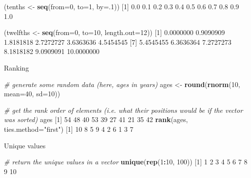 \documentclass[]{article}
\newenvironment{Shaded}{\begin{snugshade}}{\end{snugshade}}
\newcommand{\CommentTok}[1]{\textcolor[rgb]{0.56,0.35,0.01}{\textit{#1}}}
\newcommand{\DataTypeTok}[1]{\textcolor[rgb]{0.13,0.29,0.53}{#1}}
\newcommand{\DecValTok}[1]{\textcolor[rgb]{0.00,0.00,0.81}{#1}}
\newcommand{\FloatTok}[1]{\textcolor[rgb]{0.00,0.00,0.81}{#1}}
\newcommand{\KeywordTok}[1]{\textcolor[rgb]{0.13,0.29,0.53}{\textbf{#1}}}
\newcommand{\NormalTok}[1]{#1}
\newcommand{\OperatorTok}[1]{\textcolor[rgb]{0.81,0.36,0.00}{\textbf{#1}}}
\newcommand{\StringTok}[1]{\textcolor[rgb]{0.31,0.60,0.02}{#1}}
\begin{document}
\begin{Shaded}
\begin{Highlighting}[]
\NormalTok{(tenths  <-}\StringTok{ }\KeywordTok{seq}\NormalTok{(}\DataTypeTok{from=}\DecValTok{0}\NormalTok{, }\DataTypeTok{to=}\DecValTok{1}\NormalTok{, }\DataTypeTok{by=}\NormalTok{.}\DecValTok{1}\NormalTok{))}
\NormalTok{ [}\DecValTok{1}\NormalTok{] }\FloatTok{0.0} \FloatTok{0.1} \FloatTok{0.2} \FloatTok{0.3} \FloatTok{0.4} \FloatTok{0.5} \FloatTok{0.6} \FloatTok{0.7} \FloatTok{0.8} \FloatTok{0.9} \FloatTok{1.0}

\NormalTok{(twelfths <-}\StringTok{ }\KeywordTok{seq}\NormalTok{(}\DataTypeTok{from=}\DecValTok{0}\NormalTok{, }\DataTypeTok{to=}\DecValTok{10}\NormalTok{, }\DataTypeTok{length.out=}\DecValTok{12}\NormalTok{))}
\NormalTok{ [}\DecValTok{1}\NormalTok{]  }\FloatTok{0.0000000}  \FloatTok{0.9090909}  \FloatTok{1.8181818}  \FloatTok{2.7272727}  \FloatTok{3.6363636}  \FloatTok{4.5454545}
\NormalTok{ [}\DecValTok{7}\NormalTok{]  }\FloatTok{5.4545455}  \FloatTok{6.3636364}  \FloatTok{7.2727273}  \FloatTok{8.1818182}  \FloatTok{9.0909091} \FloatTok{10.0000000}
\end{Highlighting}
\end{Shaded}

Ranking

\begin{Shaded}
\begin{Highlighting}[]
\CommentTok{# generate some random data (here, ages in years)}
\NormalTok{ages <-}\StringTok{ }\KeywordTok{round}\NormalTok{(}\KeywordTok{rnorm}\NormalTok{(}\DecValTok{10}\NormalTok{, }\DataTypeTok{mean=}\DecValTok{40}\NormalTok{, }\DataTypeTok{sd=}\DecValTok{10}\NormalTok{))}

\CommentTok{# get the rank order of elements (i.e. what their positions would be if the vector was sorted)}
\NormalTok{ages}
\NormalTok{ [}\DecValTok{1}\NormalTok{] }\DecValTok{54} \DecValTok{48} \DecValTok{40} \DecValTok{53} \DecValTok{39} \DecValTok{27} \DecValTok{41} \DecValTok{21} \DecValTok{35} \DecValTok{42}
\KeywordTok{rank}\NormalTok{(ages, }\DataTypeTok{ties.method=}\StringTok{"first"}\NormalTok{)}
\NormalTok{ [}\DecValTok{1}\NormalTok{] }\DecValTok{10}  \DecValTok{8}  \DecValTok{5}  \DecValTok{9}  \DecValTok{4}  \DecValTok{2}  \DecValTok{6}  \DecValTok{1}  \DecValTok{3}  \DecValTok{7}
\end{Highlighting}
\end{Shaded}

Unique values

\begin{Shaded}
\begin{Highlighting}[]
\CommentTok{# return the unique values in a vector}
\KeywordTok{unique}\NormalTok{(}\KeywordTok{rep}\NormalTok{(}\DecValTok{1}\OperatorTok{:}\DecValTok{10}\NormalTok{, }\DecValTok{100}\NormalTok{))}
\NormalTok{ [}\DecValTok{1}\NormalTok{]  }\DecValTok{1}  \DecValTok{2}  \DecValTok{3}  \DecValTok{4}  \DecValTok{5}  \DecValTok{6}  \DecValTok{7}  \DecValTok{8}  \DecValTok{9} \DecValTok{10}
\end{Highlighting}
\end{Shaded}
\end{document}
